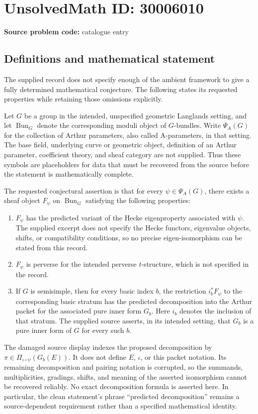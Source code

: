 \documentclass[11pt]{article}
\begin{document}
\section*{UnsolvedMath ID: 30006010}
\textbf{Source problem code:} catalogue entry
\subsection{Definitions and mathematical statement}
The supplied record does not specify enough of the ambient framework to give a fully determined mathematical conjecture. The following states its requested properties while retaining those omissions explicitly.

Let \(G\) be a group in the intended, unspecified geometric Langlands setting, and let \(\operatorname{Bun}_G\) denote the corresponding moduli object of \(G\)-bundles. Write \(\Psi_A(G)\) for the collection of Arthur parameters, also called A-parameters, in that setting. The base field, underlying curve or geometric object, definition of an Arthur parameter, coefficient theory, and sheaf category are not supplied. Thus these symbols are placeholders for data that must be recovered from the source before the statement is mathematically complete.

The requested conjectural assertion is that for every \(\psi\in\Psi_A(G)\), there exists a sheaf object \(F_\psi\) on \(\operatorname{Bun}_G\) satisfying the following properties:
\begin{enumerate}
\item \(F_\psi\) has the predicted variant of the Hecke eigenproperty associated with \(\psi\). The supplied excerpt does not specify the Hecke functors, eigenvalue objects, shifts, or compatibility conditions, so no precise eigen-isomorphism can be stated from this record.
\item \(F_\psi\) is perverse for the intended perverse \(t\)-structure, which is not specified in the record.
\item If \(G\) is semisimple, then for every basic index \(b\), the restriction \(i_b^*F_\psi\) to the corresponding basic stratum has the predicted decomposition into the Arthur packet for the associated pure inner form \(G_b\). Here \(i_b\) denotes the inclusion of that stratum. The supplied source asserts, in its intended setting, that \(G_b\) is a pure inner form of \(G\) for every such \(b\).
\end{enumerate}
The damaged source display indexes the proposed decomposition by \(\pi\in\Pi_{\iota\circ\psi}(G_b(E))\). It does not define \(E\), \(\iota\), or this packet notation. Its remaining decomposition and pairing notation is corrupted, so the summands, multiplicities, gradings, shifts, and meaning of the asserted isomorphism cannot be recovered reliably. No exact decomposition formula is asserted here. In particular, the clean statement's phrase ``predicted decomposition'' remains a source-dependent requirement rather than a specified mathematical identity.
\end{document}
